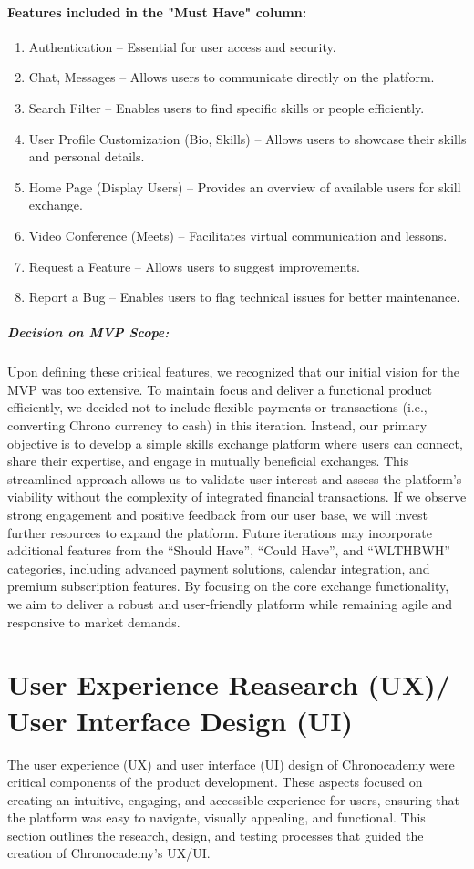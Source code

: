 \paragraph{Features included in the "Must Have" column:}
\begin{enumerate}
    \item Authentication – Essential for user access and security.
    \item Chat, Messages – Allows users to communicate directly on the platform.
    \item Search Filter – Enables users to find specific skills or people efficiently.
    \item User Profile Customization (Bio, Skills) – Allows users to showcase their skills and personal details.
    \item Home Page (Display Users) – Provides an overview of available users for skill exchange.
    \item Video Conference (Meets) – Facilitates virtual communication and lessons.
    \item Request a Feature – Allows users to suggest improvements.
    \item Report a Bug – Enables users to flag technical issues for better maintenance.
\end{enumerate}

\subparagraph{Decision on MVP Scope:}
Upon defining these critical features, we recognized that our initial vision for the MVP was too extensive.
To maintain focus and deliver a functional product efficiently, we decided not to include flexible payments or transactions (i.e., converting Chrono currency to cash) in this iteration.
Instead, our primary objective is to develop a simple skills exchange platform where users can connect, share their expertise, and engage in mutually beneficial exchanges.
This streamlined approach allows us to validate user interest and assess the platform's viability without the complexity of integrated financial transactions.
If we observe strong engagement and positive feedback from our user base, we will invest further resources to expand the platform.
Future iterations may incorporate additional features from the ``Should Have'', ``Could Have'', and ``WLTHBWH'' categories, including advanced payment solutions, calendar integration, and premium subscription features.
By focusing on the core exchange functionality, we aim to deliver a robust and user-friendly platform while remaining agile and responsive to market demands.


\section{User Experience Reasearch (UX)/ User Interface Design (UI)}\label{sec:user-experience-reasearch-(ux)/-user-interface-design-(ui)}
The user experience (UX) and user interface (UI) design of Chronocademy were critical components of the product development.
These aspects focused on creating an intuitive, engaging, and accessible experience for users, ensuring that the platform was easy to navigate, visually appealing, and functional.
This section outlines the research, design, and testing processes that guided the creation of Chronocademy's UX/UI\@.

